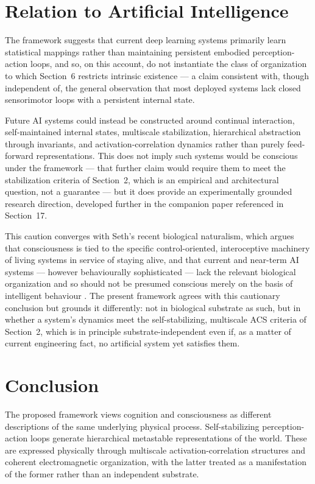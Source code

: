 \documentclass[11pt]{article}
\begin{document}
\section{Relation to Artificial Intelligence}

The framework suggests that current deep learning systems primarily learn statistical mappings rather than maintaining persistent embodied perception-action loops, and so, on this account, do not instantiate the class of organization to which Section~6 restricts intrinsic existence --- a claim consistent with, though independent of, the general observation that most deployed systems lack closed sensorimotor loops with a persistent internal state.

Future AI systems could instead be constructed around continual interaction, self-maintained internal states, multiscale stabilization, hierarchical abstraction through invariants, and activation-correlation dynamics rather than purely feed-forward representations. This does not imply such systems would be conscious under the framework --- that further claim would require them to meet the stabilization criteria of Section~2, which is an empirical and architectural question, not a guarantee --- but it does provide an experimentally grounded research direction, developed further in the companion paper referenced in Section~17.

This caution converges with Seth's recent biological naturalism, which argues that consciousness is tied to the specific control-oriented, interoceptive machinery of living systems in service of staying alive, and that current and near-term AI systems --- however behaviourally sophisticated --- lack the relevant biological organization and so should not be presumed conscious merely on the basis of intelligent behaviour \citep*{seth2025,gomezmarin2025}. The present framework agrees with this cautionary conclusion but grounds it differently: not in biological substrate as such, but in whether a system's dynamics meet the self-stabilizing, multiscale ACS criteria of Section~2, which is in principle substrate-independent even if, as a matter of current engineering fact, no artificial system yet satisfies them.

\section{Conclusion}

The proposed framework views cognition and consciousness as different descriptions of the same underlying physical process. Self-stabilizing perception-action loops generate hierarchical metastable representations of the world. These are expressed physically through multiscale activation-correlation structures and coherent electromagnetic organization, with the latter treated as a manifestation of the former rather than an independent substrate.
\end{document}
